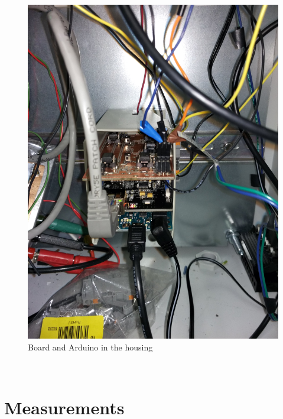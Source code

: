 \documentclass[12pt]{scrartcl}
\begin{document}
      \begin{figure}
        \includegraphics[width = \textwidth]{imschrank.jpg}
        \caption{Board and Arduino in the housing}
        \label{fig7}
      \end{figure}
      \\
    \section{Measurements}
\end{document}
